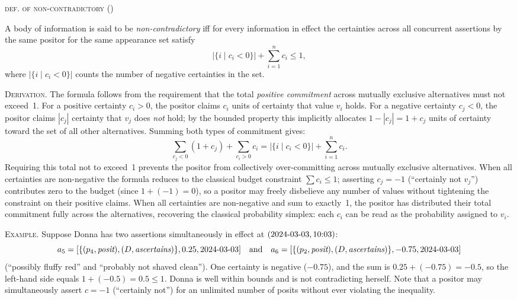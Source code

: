 \documentclass[a4paper,fleqn]{cas-sc}
\newcounter{majorcount}
\newcommand{\deffy}[3]{
	\vspace{2ex}
	\refstepcounter{majorcount}
	\noindent\textsc{#1} {\normalfont(\arabic{majorcount})}
	\\\begin{small}
	\noindent #2%
	\label{Def:#3}
	\end{small}
	\vspace{2ex}
}
\begin{document}
\deffy{def. of non-contradictory}{%
A body of information is said to be \emph{non-contradictory} iff for every information in effect the certainties across all concurrent assertions by the same positor for the same appearance set satisfy
$$|\{i \mid c_i < 0\}| + \sum_{i=1}^{n}c_i\leq 1,$$
where $|\{i \mid c_i < 0\}|$ counts the number of negative certainties in the set.}{noncontradiction}

\textsc{Derivation.} The formula follows from the requirement that the total \emph{positive commitment} across mutually exclusive alternatives must not exceed~1. For a positive certainty $c_i > 0$, the positor claims $c_i$ units of certainty that value $v_i$ holds. For a negative certainty $c_j < 0$, the positor claims $|c_j|$ certainty that $v_j$ does \emph{not} hold; by the bounded property this implicitly allocates $1 - |c_j| = 1 + c_j$ units of certainty toward the set of all other alternatives. Summing both types of commitment gives:
$$\sum_{c_j < 0}(1 + c_j) + \sum_{c_i > 0}c_i = |\{i \mid c_i < 0\}| + \sum_{i=1}^{n}c_i.$$
Requiring this total not to exceed~1 prevents the positor from collectively over-committing across mutually exclusive alternatives. When all certainties are non-negative the formula reduces to the classical budget constraint $\sum c_i \leq 1$; asserting $c_j=-1$ (``certainly not $v_j$'') contributes zero to the budget (since $1 + (-1) = 0$), so a positor may freely disbelieve any number of values without tightening the constraint on their positive claims. When all certainties are non-negative and sum to exactly~1, the positor has distributed their total commitment fully across the alternatives, recovering the classical probability simplex: each $c_i$ can be read as the probability assigned to $v_i$.

\textsc{Example.} Suppose Donna has two assertions simultaneously in effect at \((\textrm{2024\text{-}03\text{-}03}, \textrm{10:03})\):
\[a_5 = [\{(p_4,\textit{posit}),(D,\textit{ascertains})\},0.25,\textrm{2024\text{-}03\text{-}03}]\quad\text{and}\quad a_6 = [\{(p_2,\textit{posit}),(D,\textit{ascertains})\},-0.75,\textrm{2024\text{-}03\text{-}03}]\]
(``possibly fluffy red'' and ``probably not shaved clean''). One certainty is negative ($-0.75$), and the sum is $0.25 + (-0.75) = -0.5$, so the left-hand side equals $1 + (-0.5) = 0.5 \leq 1$. Donna is well within bounds and is not contradicting herself. Note that a positor may simultaneously assert \(c=-1\) (``certainly not'') for an unlimited number of posits without ever violating the inequality.
\end{document}
